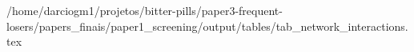 /home/darciogm1/projetos/bitter-pills/paper3-frequent-losers/papers_finais/paper1_screening/output/tables/tab_network_interactions.tex